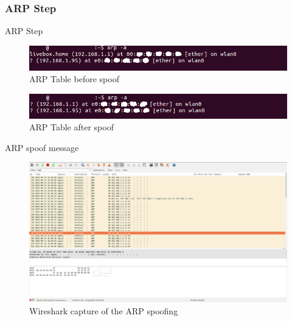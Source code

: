 \documentclass{beamer}
\begin{document}
\subsubsection{ARP Step}
\begin{frame}{ARP Step}
	\begin{figure}[!h]
		\centering
		\includegraphics[scale=0.50]{../images/arpTableBeforeSpoof.png}
		\caption{ARP Table before spoof}
		\label{ARP_before_spoof}
	\end{figure}
	\begin{figure}[!h]
		\centering
		\includegraphics[scale=0.50]{../images/arpTableAfterSpoof.png}
		\caption{ARP Table after spoof}
		\label{ARP_after_spoof}
	\end{figure}	
\end{frame}

\begin{frame}{ARP spoof message}

	\begin{figure}[!h]
		\centering
		\includegraphics[scale=0.2]{../images/wiresharArpSpoof.png}
		\caption{Wireshark capture of the ARP spoofing}
		\label{Wireshark_ARP_Spoof}
	\end{figure}
\end{frame}
\end{document}

